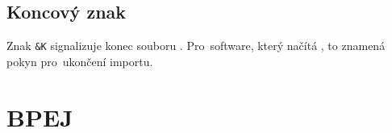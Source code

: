\subsection{Koncový znak}
\label{koncovy_znak}

Znak \texttt{\&K} signalizuje konec souboru . Pro~software, který načítá , to znamená pokyn pro~ukončení importu.

\section{BPEJ}
\label{bpej}